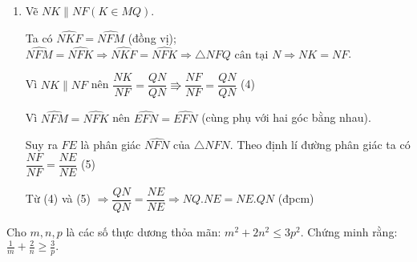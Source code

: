 \begin{ex}
{\begin{enumerate}[1)]
			Có $\widehat{NEM}=\widehat{PEQ}$, $\widehat{MFM}=\widehat{PFQ}$ (3)
			
			Từ (1), (2) và (3) suy ra $\widehat{NFM}=\widehat{MFM}$, do đó $FM$ là tia phân giác của $\widehat{NFM}$.
			
			\item Vẽ $NK \parallel NF (K \in MQ)$.
			
			Ta có $\widehat{NKF}=\widehat{NFM}$ (đồng vị); $\widehat{NFM}=\widehat{NFK} \Rightarrow \widehat{NKF}=\widehat{NFK} \Rightarrow \triangle NFQ \text{ cân tại } N \Rightarrow NK=NF$.
			
			Vì $NK \parallel NF$ nên $\dfrac{NK}{NF}=\dfrac{QN}{QN} \Rrightarrow \dfrac{NF}{NF}=\dfrac{QN}{QN}$ (4)
			
			Vì $\widehat{NFM}=\widehat{NFK}$ nên $\widehat{EFN}=\widehat{EFN}$ (cùng phụ với hai góc bằng nhau).
			
			Suy ra $FE$ là phân giác $\widehat{NFN}$ của $\triangle NFN$. Theo định lí đường phân giác ta có $\dfrac{NF}{NF}=\dfrac{NE}{NE}$ (5)
			
			Từ (4) và (5) $\Rightarrow \dfrac{QN}{QN}=\dfrac{NE}{NE} \Rightarrow NQ.NE=NE.QN$ (đpcm)
		\end{enumerate}
	}
\end{ex}

\begin{ex}%
	Cho $m,n,p$ là các số thực dương thỏa mãn: $m^2+2n^2 \le 3p^2$. Chứng minh rằng: $ \displaystyle \frac{1}{m}+ \frac{2}{n} \ge \frac{3}{p}.$
\end{ex}
